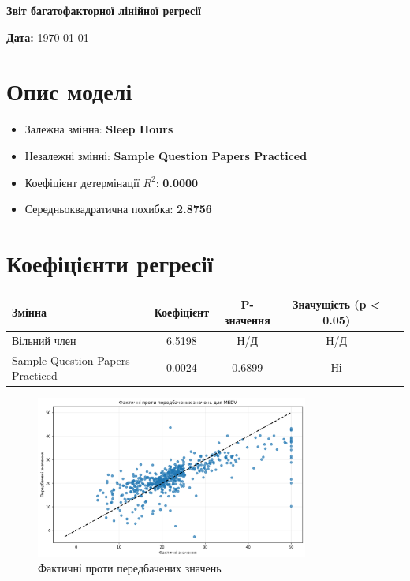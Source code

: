 \documentclass[12pt,a4paper]{article}
\begin{document}
\begin{center}
\Large\textbf{Звіт багатофакторної лінійної регресії}
\end{center}

\vspace{1cm}

\textbf{Дата:} \today

\vspace{0.5cm}

\section{Опис моделі}

\begin{itemize}
    \item Залежна змінна: \textbf{Sleep Hours}
    \item Незалежні змінні: \textbf{Sample Question Papers Practiced}
    \item Коефіцієнт детермінації $R^2$: \textbf{0.0000}
    \item Середньоквадратична похибка: \textbf{2.8756}
\end{itemize}

\vspace{0.5cm}

\section{Коефіцієнти регресії}

\begin{center}
\begin{tabular}{lcccc}
\toprule
\textbf{Змінна} & \textbf{Коефіцієнт} & \textbf{P-значення} & \textbf{Значущість (p < 0.05)} \\
\midrule
Вільний член & 6.5198 & Н/Д & Н/Д \\
Sample Question Papers Practiced & 0.0024 & 0.6899 & Ні \\

\bottomrule
\end{tabular}
\end{center}

\vspace{1cm}

\begin{figure}[H]
    \centering
    \includegraphics[width=0.8\textwidth]{actual_vs_predicted.png}
    \caption{Фактичні проти передбачених значень}
    \label{fig:фактичні_проти_передбачених_значень}
\end{figure}
\end{document}
